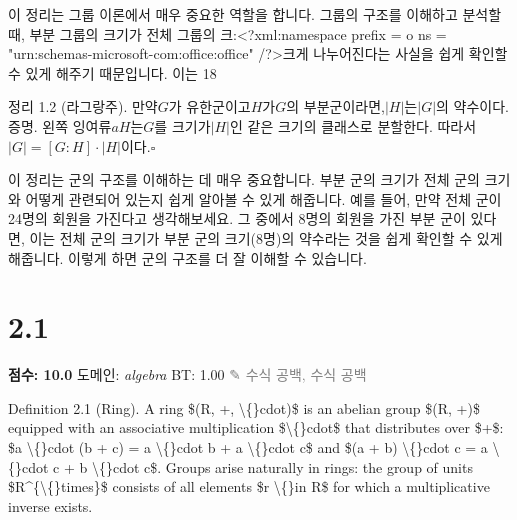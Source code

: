 \documentclass[11pt,a4paper,oneside]{memoir}
\begin{document}
\begin{tcolorbox}[kostyle]
\begin{motivation}
이 정리는 그룹 이론에서 매우 중요한 역할을 합니다. 그룹의 구조를 이해하고 분석할 때, 부분 그룹의 크기가 전체 그룹의 크:<?xml:namespace prefix = o ns = "urn:schemas-microsoft-com:office:office" /?>크게 나누어진다는 사실을 쉽게 확인할 수 있게 해주기 때문입니다. 이는 18
\end{motivation}

정리 1.2 (라그랑주). 만약$G$가 유한군이고$H$가$G$의 부분군이라면,$|H|$는$|G|$의 약수이다. 증명. 왼쪽 잉여류$aH$는$G$를 크기가$|H|$인 같은 크기의 클래스로 분할한다. 따라서$|G| = [G:H] \cdot |H|$이다.$\square$

\begin{plainexplain}
  이 정리는 군의 구조를 이해하는 데 매우 중요합니다. 부분 군의 크기가 전체 군의 크기와 어떻게 관련되어 있는지 쉽게 알아볼 수 있게 해줍니다. 예를 들어, 만약 전체 군이 24명의 회원을 가진다고 생각해보세요. 그 중에서 8명의 회원을 가진 부분 군이 있다면, 이는 전체 군의 크기가 부분 군의 크기(8명)의 약수라는 것을 쉽게 확인할 수 있게 해줍니다. 이렇게 하면 군의 구조를 더 잘 이해할 수 있습니다.
\end{plainexplain}
\end{tcolorbox}
\vspace{0.8em}

\section{2.1}
\noindent \textbf{\color{ScoreRed}점수: 10.0} \quad 도메인: \textit{algebra}  \quad \textcolor{ScoreGreen}{BT: 1.00} \quad \textcolor{gray}{\small ✎ 수식 공백, 수식 공백}
\vspace{0.4em}

\begin{tcolorbox}[origstyle]
\small Definition 2.1 (Ring). A ring \$(R, +, \textbackslash\{\}cdot)\$ is an abelian group \$(R, +)\$ equipped with an associative multiplication \$\textbackslash\{\}cdot\$ that distributes over \$+\$: \$a \textbackslash\{\}cdot (b + c) = a \textbackslash\{\}cdot b + a \textbackslash\{\}cdot c\$ and \$(a + b) \textbackslash\{\}cdot c = a \textbackslash\{\}cdot c + b \textbackslash\{\}cdot c\$. Groups arise naturally in rings: the group of units \$R\textasciicircum{}\{\textbackslash\{\}times\}\$ consists of all elements \$r \textbackslash\{\}in R\$ for which a multiplicative inverse exists.
\end{tcolorbox}
\vspace{0.3em}
\end{document}
